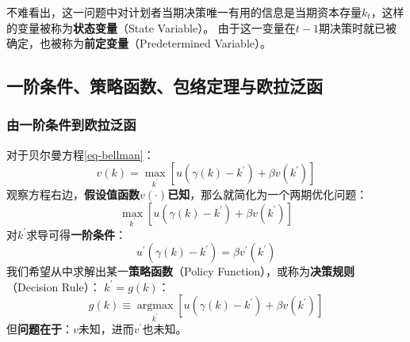 不难看出，这一问题中对计划者当期决策唯一有用的信息是当期资本存量$k_t$，这样的变量被称为\textbf{状态变量}（State Variable）。
由于这一变量在$t-1$期决策时就已被确定，也被称为\textbf{前定变量}（Predetermined Variable）。


\subsection{一阶条件、策略函数、包络定理与欧拉泛函} \label{subsec-func-euler}


\subsubsection{由一阶条件到欧拉泛函}

对于贝尔曼方程\ref{eq-bellman}：
$$
v\left(k\right)=\max _{k^{\prime}}\left[u\left(\gamma\left(k\right)-k^{\prime}\right)+\beta v\left(k^{\prime}\right)\right]
$$
观察方程右边，\textbf{假设值函数$v\left(\cdot\right)$已知}，那么就简化为一个两期优化问题：
$$
\max _{k^{\prime}}\left[u\left(\gamma\left(k\right)-k^{\prime}\right)+\beta v\left(k^{\prime}\right)\right]
$$
对$k^{\prime}$求导可得\textbf{一阶条件}：
\begin{equation}    \label{bellman-foc}
    u^{\prime}\left(\gamma\left(k\right)-k^{\prime}\right) = \beta v^{\prime}\left(k^{\prime}\right)
\end{equation}
我们希望从中求解出某一\textbf{策略函数}（Policy Function），或称为\textbf{决策规则}（Decision Rule）：
$k^{\prime}=g\left(k\right)$：
$$
g\left(k\right) \equiv \underset{k^{\prime}}{\operatorname{argmax}}[u(\gamma\left(k\right)-k^{\prime})+\beta v\left(k^{\prime}\right)]
$$
但\textbf{问题在于}：$v$未知，进而$v^{\prime}$也未知。

